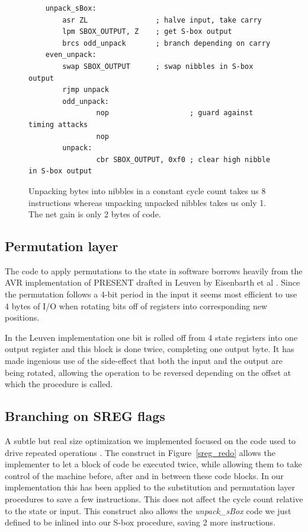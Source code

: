 \documentclass{llncs}
\begin{document}
\begin{figure}
\begin{lstlisting}
	unpack_sBox:
		asr ZL                ; halve input, take carry
		lpm SBOX_OUTPUT, Z    ; get S-box output
		brcs odd_unpack       ; branch depending on carry
	even_unpack:
		swap SBOX_OUTPUT      ; swap nibbles in S-box output
		rjmp unpack
        odd_unpack:
                nop                   ; guard against timing attacks
                nop
        unpack:
                cbr SBOX_OUTPUT, 0xf0 ; clear high nibble in S-box output
	\end{lstlisting}
	\caption{Unpacking bytes into nibbles in a constant cycle count takes us 8 instructions whereas unpacking unpacked nibbles takes us only 1. The net gain is only 2 bytes of code.}
\label{unpacking_code}
\end{figure}



\subsection{Permutation layer}
The code to apply permutations to the state in software borrows heavily from the AVR implementation of PRESENT drafted in Leuven by Eisenbarth et al \cite{eisenbarth2012compact}.
Since the permutation follows a 4-bit period in the input it seems most efficient to use 4 bytes of I/O when rotating bits off of registers into corresponding new positions.

In the Leuven implementation one bit is rolled off from 4 state registers into one output register and this block is done twice, completing one output byte. It has made ingenious use of the side-effect that both the input and the output are being rotated, allowing the operation to be reversed depending on the offset at which the procedure is called.

\subsection{Branching on SREG flags}
A subtle but real size optimization we implemented focused on the code used to drive repeated operations .
The construct in Figure~\ref{sreg_redo} allows the implementer to let a block of code be executed twice, while allowing them to take control of the machine before, after and in between these code blocks.
In our implementation this has been applied to the substitution and permutation layer procedures to save a few instructions.
This does not affect the cycle count relative to the state or input.
This construct also allows the \textit{unpack\_sBox} code we just defined to be inlined into our S-box procedure, saving 2 more instructions.
\end{document}
